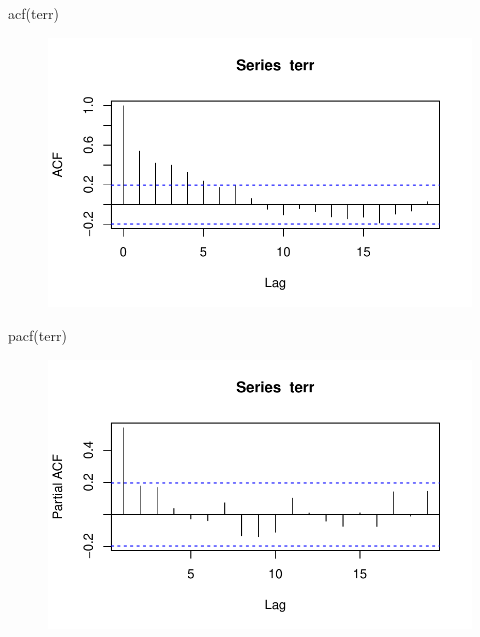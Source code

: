 \documentclass[
  letterpaper,
  DIV=11,
  numbers=noendperiod]{scrartcl}
\newenvironment{Shaded}{\begin{snugshade}}{\end{snugshade}}
\newcommand{\FunctionTok}[1]{\textcolor[rgb]{0.28,0.35,0.67}{#1}}
\newcommand{\NormalTok}[1]{\textcolor[rgb]{0.00,0.23,0.31}{#1}}
\theoremstyle{plain}
\theoremstyle{plain}
\theoremstyle{definition}
\theoremstyle{definition}
\theoremstyle{remark}
\begin{document}
\begin{Shaded}
\begin{Highlighting}[]
\FunctionTok{acf}\NormalTok{(terr)}
\end{Highlighting}
\end{Shaded}

\begin{figure}[H]

{\centering \includegraphics{processo_linear_geral_files/figure-pdf/unnamed-chunk-5-1.pdf}

}

\end{figure}

\begin{Shaded}
\begin{Highlighting}[]
\FunctionTok{pacf}\NormalTok{(terr)}
\end{Highlighting}
\end{Shaded}

\begin{figure}[H]

{\centering \includegraphics{processo_linear_geral_files/figure-pdf/unnamed-chunk-5-2.pdf}

}

\end{figure}
\end{document}
